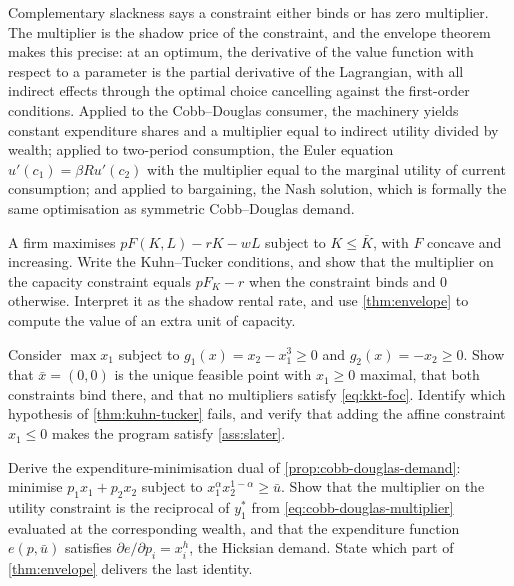 Complementary slackness says a constraint either binds or has zero multiplier.
The multiplier is the shadow price of the constraint, and the envelope theorem
makes this precise: at an optimum, the derivative of the value function with
respect to a parameter is the partial derivative of the Lagrangian, with all
indirect effects through the optimal choice cancelling against the first-order
conditions. Applied to the Cobb--Douglas consumer, the machinery yields constant
expenditure shares and a multiplier equal to indirect utility divided by wealth;
applied to two-period consumption, the Euler equation
$u'(c_1)=\beta Ru'(c_2)$ with the multiplier equal to the marginal utility of
current consumption; and applied to bargaining, the Nash solution, which is
formally the same optimisation as symmetric Cobb--Douglas demand.

\begin{exercise}\label{ex:opt-1}
	A firm maximises $pF(K,L)-rK-wL$ subject to $K\leq\bar K$, with $F$ concave and
	increasing. Write the Kuhn--Tucker conditions, and show that the multiplier on
	the capacity constraint equals $pF_K-r$ when the constraint binds and $0$
	otherwise. Interpret it as the shadow rental rate, and use
	\autoref{thm:envelope} to compute the value of an extra unit of capacity.
\end{exercise}

\begin{exercise}\label{ex:opt-2}
	Consider $\max x_1$ subject to $g_1(x)=x_2-x_1^3\geq0$ and
	$g_2(x)=-x_2\geq0$. Show that $\bar x=(0,0)$ is the unique feasible point with
	$x_1\geq0$ maximal, that both constraints bind there, and that no multipliers
	satisfy \eqref{eq:kkt-foc}. Identify which hypothesis of
	\autoref{thm:kuhn-tucker} fails, and verify that adding the affine constraint
	$x_1\leq0$ makes the program satisfy \autoref{ass:slater}.
\end{exercise}

\begin{exercise}\label{ex:opt-3}
	Derive the expenditure-minimisation dual of
	\autoref{prop:cobb-douglas-demand}: minimise $p_1x_1+p_2x_2$ subject to
	$x_1^{\alpha}x_2^{1-\alpha}\geq\bar u$. Show that the multiplier on the utility
	constraint is the reciprocal of $y_1^\ast$ from
	\eqref{eq:cobb-douglas-multiplier} evaluated at the corresponding wealth, and
	that the expenditure function $e(p,\bar u)$ satisfies
	$\partial e/\partial p_i=x_i^h$, the Hicksian demand. State which part of
	\autoref{thm:envelope} delivers the last identity.
\end{exercise}
